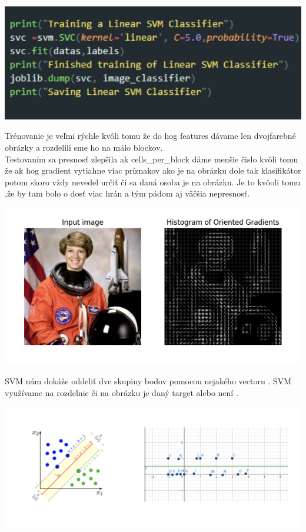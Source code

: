 \documentclass{article}
\begin{document}
\center\includegraphics[width=0.9\linewidth]{./image5.png}\\
\begin{flushleft}
\Large{Trénovanie je veľmi rýchle kvôli tomu že  do hog features dávame len dvojfarebné obrázky a rozdelili sme ho na málo blockov.\\   Testovaním sa presnosť zlepšila ak cells\_per\_block dáme menšie čislo kvôli tomu že ak hog gradient vytiahne viac príznakov ako je na obrázku dole  tak klasifikátor potom skoro vždy nevedel určiť či sa daná osoba je na obrázku. Je to kvôoli tomu ,že  by tam bolo o dosť viac hrán a tým pádom aj väčšia nepresnosť.  }
\end{flushleft}

\center\includegraphics[width=0.9\linewidth]{./image6.png}\\
    \begin{flushleft}

\Large{SVM  nám dokáže oddeliť dve skupiny bodov pomocou nejakého vectoru . SVM využívame na rozdelnie či na obrázku je daný target alebo není .}
\end{flushleft}

\center\includegraphics[width=0.9\linewidth]{./image7.png}\\
\end{document}
